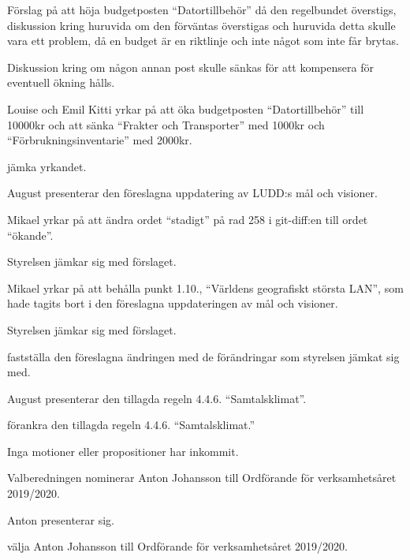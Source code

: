\documentclass{protokoll}
\begin{document}
Förslag på att höja budgetposten ``Datortillbehör'' då den regelbundet
överstigs, diskussion kring huruvida om den förväntas överstigas och huruvida
detta skulle vara ett problem, då en budget är en riktlinje och inte något som
inte får brytas.  

Diskussion kring om någon annan post skulle sänkas för att kompensera för
eventuell ökning hålls. 

Louise och Emil Kitti yrkar på att öka budgetposten ``Datortillbehör'' till 
10000kr och att sänka ``Frakter och Transporter'' med 1000kr och ``Förbrukningsinventarie'' med 2000kr. 
\begin{beslut}
  \att jämka yrkandet. 
\end{beslut}

August presenterar den föreslagna uppdatering av LUDD:s mål och visioner. 

Mikael yrkar på att ändra ordet ``stadigt'' på rad 258 i git-diff:en till ordet
``ökande''. 

Styrelsen jämkar sig med förslaget. 


Mikael yrkar på att behålla punkt 1.10., ``Världens geografiskt största LAN'',
som hade tagits bort i den föreslagna uppdateringen av mål och visioner. 

Styrelsen jämkar sig med förslaget. 

\begin{beslut}
  \att fastställa den föreslagna ändringen med de förändringar som styrelsen 
  jämkat sig med. 
\end{beslut}


August presenterar den tillagda regeln 4.4.6. ``Samtalsklimat''.

\begin{beslut}
  \att förankra den tillagda regeln 4.4.6. ``Samtalsklimat.''
\end{beslut}

Inga motioner eller propositioner har inkommit.

Valberedningen nominerar Anton Johansson till Ordförande för verksamhetsåret 2019/2020.

Anton presenterar sig.

\begin{beslut}
  \att välja Anton Johansson till Ordförande för verksamhetsåret 2019/2020.
\end{beslut}
\end{document}
